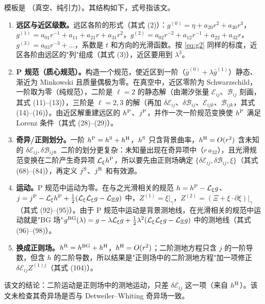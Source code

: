 \documentclass[11pt,a4paper]{ctexart}
\numberwithin{equation}{section}
\begin{document}
模板是 \citet{Gralla2012}（真空、纯引力）。其结构如下，式号指该文。
\begin{enumerate}
\item \textbf{远区与近区级数。}远区各阶的形式（其式 (2)）：$g^{(0)}=\eta+a_{20}r^2+a_{30}r^3$，$g^{(1)}=a_{01}r^{-1}+a_{11}+a_{21}r+a_{31}r^2$，$g^{(2)}=a_{02}r^{-2}+a_{12}r^{-1}+a_{22}+a_{32}r$，$g^{(3)}=a_{03}r^{-3}+\dots$，系数是 $t$ 和方向的光滑函数。按 \eqref{eq:g2} 同样的标度，近区各阶由远区的"列"组成（其式 (3)），近区要用到 $\lambda^3$。
\item \textbf{P 规范（质心规范）。}构造一个规范，使近区到一阶（$\bar g^{(0)}+\lambda\bar g^{(1)}$）静态、渐近为 Minkowski 且质量偶极为零。在真空中，近区零阶为 Schwarzschild，一阶取为零（纯规范），二阶是 $\ell=2$ 的静态解（由潮汐张量 $\mathcal E_{ij}$、$\mathcal B_{ij}$ 刻画，其式 (11)--(13)），三阶是 $\ell=2,3$ 的解（再加 $\delta\mathcal E_{ij}$、$\delta\mathcal B_{ij}$、$\mathcal E_{ijk}$、$\mathcal B_{ijk}$，其式 (14)--(16)）。由近区解重建远区的 $h^{\rm P}$、$j^{\rm P}$，并作一次一阶规范变换使 $h^{\rm P}$ 满足 Lorenz 条件（其式 (28)--(29)）。
\item \textbf{奇异/正则划分。}一阶 $h^{\rm P}=h^{\rm S}+h^{\rm H}$，$h^{\rm S}$ 只含背景曲率，$h^{\rm H}=O(r^2)$ 含未知的 $\delta\mathcal E_{ij},\delta\mathcal B_{ij}$。二阶的划分更复杂：未知量出现在奇异项中（$r\,a_{32}$），且光滑规范变换在二阶产生奇异项 $\mathcal L_\xi h^{\rm P}$，所以要先由正则场确定 $\{\delta\mathcal E_{ij},\delta\mathcal B_{ij},\xi\}$（其式 (68)--(84)），再定义 $j^{\rm S}$、$j^{\rm R}$ 和有效源。
\item \textbf{运动。}P 规范中运动为零。在与之光滑相关的规范 $h=h^{\rm P}-\mathcal L_\xi g$、$j=j^{\rm P}-\mathcal L_\xi h^{\rm P}+\tfrac12(\mathcal L_\xi\mathcal L_\xi g-\mathcal L_\Xi g)$ 中，$Z^{(1)}=\xi|_\gamma$，$Z^{(2)}=(\Xi+\xi\cdot\partial\xi)|_\gamma$（其式 (92)--(95)）。由于 P 规范中运动是背景测地线，在光滑相关的规范中运动就是"BG 场"$g^{\rm BG}(\lambda)=g-\lambda\mathcal L_\xi g+\tfrac12\lambda^2(\mathcal L_\xi\mathcal L_\xi g-\mathcal L_\Xi g)$ 中的测地线（其式 (96)--(98)）。
\item \textbf{换成正则场。}$h^{\rm R}=h^{\rm BG}+h^{\rm H}$，$h^{\rm H}=O(r^2)$；二阶测地方程只含 $j$ 的一阶导数，但含 $h$ 的二阶导数，所以结果是"正则场中的二阶测地方程"加一项修正 $\delta\mathcal E_{ij}Z^{(1)j}$（其式 (104)）。
\end{enumerate}
该文的结论：二阶运动是正则场中的测地运动，只差 $\delta\mathcal E_{ij}$ 这一项（来自 $h^{\rm H}$）。该文未检查其奇异场是否与 Detweiler--Whiting 奇异场一致。
\end{document}
